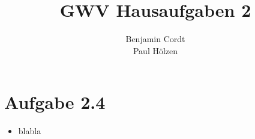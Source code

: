 \documentclass[12pt, paper=a4]{article}
\author{Benjamin Cordt\\Paul Hölzen}
\title{GWV Hausaufgaben 2}
\begin{document}
\maketitle

\section*{Aufgabe 2.4}
\begin{itemize}
\item blabla
\end{itemize}
\end{document}
